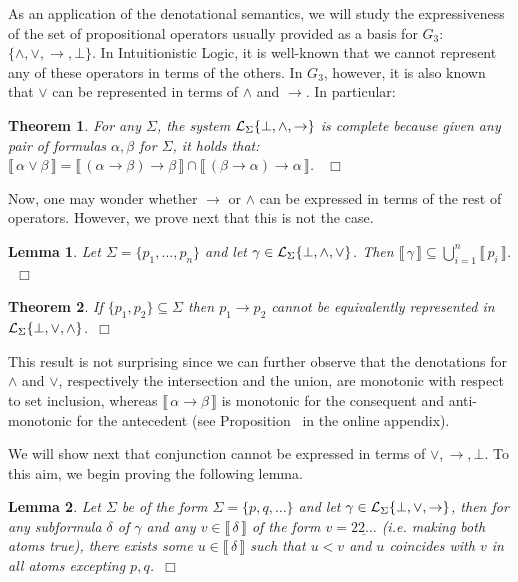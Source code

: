 \documentclass{tlp}
\def\L{{\cal L}}
\newcommand{\den}[1]{\llbracket \, #1 \, \rrbracket}
\def\qed{~\hfill$\Box$}
\newtheorem{theorem}{Theorem}
\newtheorem{lemma}{Lemma}
\newcommand{\str}[1]{\underline{#1}}
\begin{document}
As an application of the denotational semantics, we will study the expressiveness of the set of propositional operators usually provided as a basis for $G_3$: $\{\wedge,\vee,\rightarrow,\bot\}$. In Intuitionistic Logic, it is well-known that we cannot represent any of these operators in terms of the others. In $G_3$, however, it is also known 
that $\vee$ can be represented in terms of $\wedge$ and $\rightarrow$. In particular:

\begin{theorem}\label{th:or} 
For any $\Sigma$, the system $\L_{\Sigma}\{\bot, \wedge, \rightarrow\}$ is complete because given any pair of formulas $\alpha, \beta$ for $\Sigma$, it holds that:
$\den{ \alpha \vee \beta} = \den{(\alpha \rightarrow  \beta) \rightarrow \beta} \cap \den{(\beta \rightarrow  \alpha) \rightarrow \alpha}$. \qed
\end{theorem}

Now, one may wonder whether $\rightarrow$ or $\wedge$ can be expressed in terms of the rest of operators. However, we prove next that this is not the case.

\begin{lemma}\label{lem:imply} 
Let $\Sigma=\{p_1,\dots,p_n\}$ and let $\gamma \in \L_{\Sigma}\{\bot, \wedge, \vee\}$. Then $\den\gamma \subseteq \bigcup^n_{i=1} \den{p_i}$. \qed
\end{lemma}

\begin{theorem}\label{th:imp} 
If $\{p_1,p_2\}\subseteq \Sigma$ then $p_1 \rightarrow p_2$ cannot be equivalently represented in $\L_{\Sigma}\{\bot, \vee, \wedge\}$.\qed
\end{theorem}

\noindent This result is not surprising since we can further observe that the denotations for $\wedge$ and $\vee$, respectively the intersection and the union, are monotonic with respect to set inclusion, whereas $\den{\alpha \rightarrow \beta}$ is monotonic for the consequent and anti-monotonic for the antecedent (see Proposition~ in the online appendix).

We will show next that conjunction cannot be expressed in terms of $\vee, \rightarrow, \bot$. To this aim, we begin proving the following lemma.

\begin{lemma}\label{lem:pq} 
Let $\Sigma$ be of the form $\Sigma=\{p,q,\dots\}$ and let $\gamma \in \L_{\Sigma}\{\bot, \vee, \rightarrow\}$, then for any subformula $\delta$ of $\gamma$ and any $v \in \den\delta$ of the form $v=\str{22\dots}$ (i.e. making both atoms true), there exists some $u \in \den{\delta}$ such that $u<v$ and $u$ coincides with $v$ in all atoms excepting $p,q$.\qed
\end{lemma}
\end{document}
